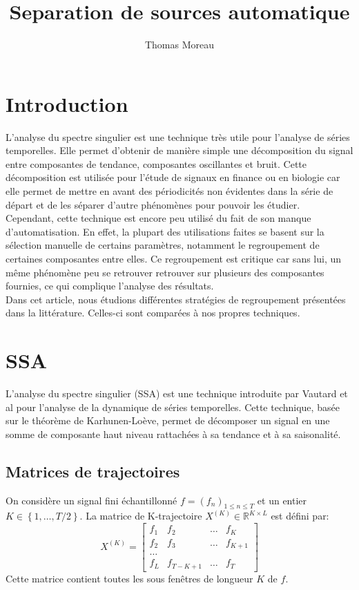 \documentclass{gretsi}
\title{Separation de sources automatique}
\author{Thomas Moreau}
\date{}
\begin{document}
\maketitle


\section{Introduction}

L'analyse du spectre singulier est une technique très utile pour l'analyse de séries temporelles. Elle permet d'obtenir de manière simple une décomposition du signal entre composantes de tendance, composantes oscillantes et bruit. Cette décomposition est utilisée pour l'étude de signaux en finance ou en biologie car elle permet de mettre en avant des périodicités non évidentes dans la série de départ et de les séparer d'autre phénomènes pour pouvoir les étudier.\\


Cependant, cette technique est encore peu utilisé du fait de son manque d'automatisation. En effet, la plupart des utilisations faites se basent sur la sélection manuelle de certains paramètres, notamment le regroupement de certaines composantes entre elles. Ce regroupement est critique car sans lui, un même phénomène peu se retrouver retrouver sur plusieurs des composantes fournies, ce qui complique l'analyse des résultats.\\

Dans cet article, nous étudions différentes stratégies de regroupement présentées dans la littérature. Celles-ci sont comparées à nos propres techniques.

\section{SSA}

L'analyse du spectre singulier (SSA) est une technique introduite par Vautard et al \cite{vautard_ghil_89_SSA} pour l'analyse de la dynamique de séries temporelles. Cette technique, basée sur le théorème de Karhunen-Loève, permet de décomposer un signal en une somme de composante haut niveau rattachées à sa tendance et à sa saisonalité.

\subsection{Matrices de trajectoires}

On considère un signal fini échantillonné $f = (f_n)_{1 \le n\le T}$ et un entier $K \in \left \{ 1, \dots, T/2 \right \}$. La matrice de K-trajectoire $X^{(K)} \in \mathbb{R}^{K\times L}$ est défini par:
$$ X^{(K)} = \begin{bmatrix}
	f_1 & f_2 &\dots & f_K\\
	f_2 & f_3 &\dots & f_{K+1}\\
	\dots\\
	f_{L} & f_{T-K+1} &\dots & f_T
\end{bmatrix}$$
Cette matrice contient toutes les sous fenêtres de longueur $K$ de $f$.\\
\end{document}
